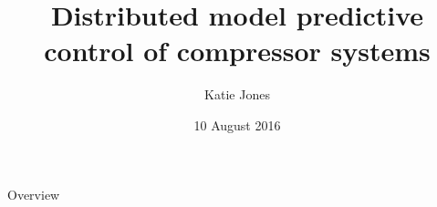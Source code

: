 \documentclass{beamer}
\author{Katie Jones}
\title{Distributed model predictive control of compressor systems}
\date{10 August 2016}
\begin{document}
\frame{\maketitle}

\begin{frame}{Overview}
  \begin{multicols}{2}
	\tableofcontents
\end{multicols}
\end{frame}






\end{document}
